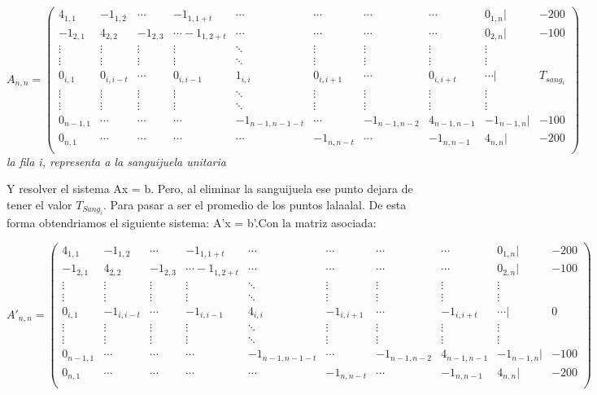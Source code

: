 \documentclass[a4paper]{article}
\begin{document}
$$
A_{n,n} =
 \begin{pmatrix}
  4_{1,1} & -1_{1,2} & \cdots & -1_{1,1+t} & \cdots & \cdots & \cdots & \cdots  & 0_{1,n} | & -200 \\
   -1_{2,1} & 4_{2,2} & -1_{2,3} & \cdots -1_{1,2+t} & \cdots & \cdots & \cdots & \cdots & 0_{2,n} | & -100 \\
  \vdots  & \vdots  & \vdots & \vdots  & \ddots & \vdots  & \vdots & \vdots & \vdots\\
  \vdots  & \vdots & \vdots & \vdots  & \ddots & \vdots  & \vdots & \vdots & \vdots\\
   0_{i,1} & 0_{i,i-t} & \cdots & 0_{i,i-1} & 1_{i,i} &  0_{i,i+1} & \cdots & 0_{i,i+t} & \cdots | & T_{sang_i} \\
  \vdots  & \vdots  & \vdots & \vdots  & \ddots  & \vdots  & \vdots & \vdots & \vdots\\
  \vdots  & \vdots  & \vdots & \vdots  & \ddots  & \vdots  & \vdots & \vdots & \vdots\\
   0_{n-1,1} & \cdots & \cdots & \cdots & -1_{n-1,n-1-t} & \cdots & -1_{n-1,n-2} & 4_{n-1,n-1} &  -1_{n-1,n} | & -100 \\
   0_{n,1} & \cdots & \cdots & \cdots & \cdots & -1_{n,n-t} & \cdots & -1_{n,n-1} &  4_{n,n} | & -200 \\
 \end{pmatrix}
$$
\textit{la fila i, representa a la sanguijuela unitaria}\newline

Y resolver el sistema Ax = b.\newline
Pero, al eliminar la sanguijuela ese punto dejara de tener el valor $T_{Sang_i}$. Para pasar a ser el promedio de los puntos lalaalal. De esta forma obtendriamos el siguiente sistema: A'x = b'.\newline Con la matriz asociada:


$$
A'_{n,n} =
 \begin{pmatrix}
  4_{1,1} & -1_{1,2} & \cdots & -1_{1,1+t} & \cdots & \cdots & \cdots & \cdots  & 0_{1,n} | & -200 \\
   -1_{2,1} & 4_{2,2} & -1_{2,3} & \cdots -1_{1,2+t} & \cdots & \cdots & \cdots & \cdots & 0_{2,n} | & -100 \\
  \vdots  & \vdots  & \vdots & \vdots  & \ddots & \vdots  & \vdots & \vdots & \vdots\\
  \vdots  & \vdots & \vdots & \vdots  & \ddots & \vdots  & \vdots & \vdots & \vdots\\
   0_{i,1} & -1_{i,i-t} & \cdots & -1_{i,i-1} & 4_{i,i} &  -1_{i,i+1} & \cdots & -1_{i,i+t} & \cdots | & 0 \\
  \vdots  & \vdots  & \vdots & \vdots  & \ddots  & \vdots  & \vdots & \vdots & \vdots\\
  \vdots  & \vdots  & \vdots & \vdots  & \ddots  & \vdots  & \vdots & \vdots & \vdots\\
   0_{n-1,1} & \cdots & \cdots & \cdots & -1_{n-1,n-1-t} & \cdots & -1_{n-1,n-2} & 4_{n-1,n-1} &  -1_{n-1,n} | & -100 \\
   0_{n,1} & \cdots & \cdots & \cdots & \cdots & -1_{n,n-t} & \cdots & -1_{n,n-1} &  4_{n,n} | & -200 \\
 \end{pmatrix}
$$
\end{document}

